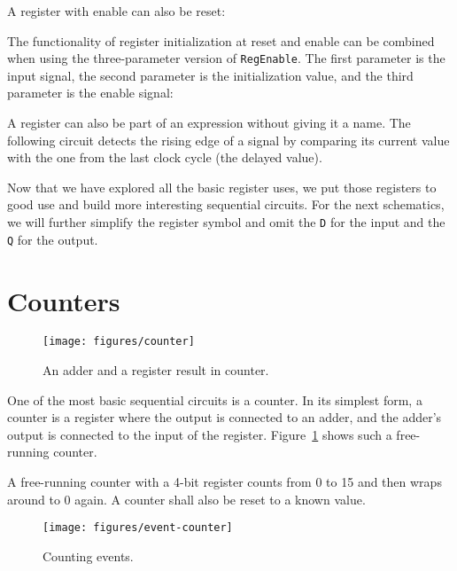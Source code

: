 \documentclass[%
    10pt,
    headinclude, footexclude,
    openright, %
    notitlepage,
    cleardoubleempty,
    headsepline,
    pointlessnumbers,
    bibtotoc, idxtotoc,
    ]{scrbook}
\newcommand{\scale}{0.7}
\newcommand{\code}[1]{{\lstinline[basicstyle=\small\ttfamily]{#1}}}
\begin{document}
\noindent A register with enable can also be reset:


\noindent The functionality of register initialization at reset and enable can be combined when
using the three-parameter version of \code{RegEnable}. The first parameter is the input signal,
the second parameter is the initialization value, and the third parameter is the enable signal:




A register can also be part of an expression without giving it a name.
The following circuit detects the rising edge of a signal by comparing its current
value with the one from the last clock cycle (the delayed value).


Now that we have explored all the basic register uses, we put those registers to
good use and build more interesting sequential circuits. For the next schematics, we
will further simplify the register symbol and omit the \code{D} for the input and the
\code{Q} for the output.

\section{Counters}
\label{sec:counter}

\begin{figure}
  \centering
  \texttt{[image: figures/counter]}
  \caption{An adder and a register result in counter.}
  \label{fig:counter}
\end{figure}

One of the most basic sequential circuits is a counter. In its simplest form, a counter is a register
where the output is connected to an adder, and the adder's output is connected to the input
of the register. Figure~\ref{fig:counter} shows such a free-running counter.

A free-running counter with a 4-bit register counts from 0 to 15 and then wraps around
to 0 again. A counter shall also be reset to a known value.


\begin{figure}
  \centering
  \texttt{[image: figures/event-counter]}
  \caption{Counting events.}
  \label{fig:event-counter}
\end{figure}
\end{document}
